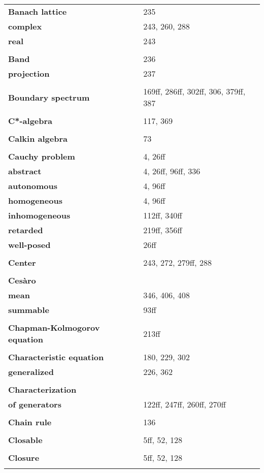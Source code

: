 \documentclass[10pt]{scrartcl}
\begin{document}
\begin{longtable}{>{\bfseries}p{6cm}p{8cm}}
\textbf{Banach lattice} & 235 \\
\quad complex & 243, 260, 288 \\
\quad real & 243 \\
\\
\textbf{Band} & 236 \\
\quad projection & 237 \\
\\
\textbf{Boundary spectrum} & 169ff, 286ff, 302ff, 306, 379ff, 387 \\
\\
\textbf{C*-algebra} & 117, 369 \\
\\
\textbf{Calkin algebra} & 73 \\
\\
\textbf{Cauchy problem} & 4, 26ff \\
\quad abstract & 4, 26ff, 96ff, 336 \\
\quad autonomous & 4, 96ff \\
\quad homogeneous & 4, 96ff \\
\quad inhomogeneous & 112ff, 340ff \\
\quad retarded & 219ff, 356ff \\
\quad well-posed & 26ff \\
\\
\textbf{Center} & 243, 272, 279ff, 288 \\
\\
\textbf{Cesàro} & \\
\quad mean & 346, 406, 408 \\
\quad summable & 93ff \\
\\
\textbf{Chapman-Kolmogorov equation} & 213ff \\
\\
\textbf{Characteristic equation} & 180, 229, 302 \\
\quad generalized & 226, 362 \\
\\
\textbf{Characterization} & \\
\quad of generators & 122ff, 247ff, 260ff, 270ff \\
\\
\textbf{Chain rule} & 136 \\
\\
\textbf{Closable} & 5ff, 52, 128 \\
\\
\textbf{Closure} & 5ff, 52, 128 \\
\\

\end{longtable}
\end{document}
